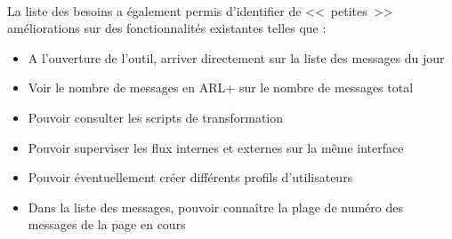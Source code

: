 			\paragraph{}%
			La liste des besoins a également permis d'identifier de <<~petites~>>
			améliorations sur des fonctionnalités existantes telles que :
			\begin{itemize}
			  \item A l'ouverture de l'outil, arriver directement sur la liste des
			  messages du jour
			  \item Voir le nombre de messages en ARL+ sur le nombre de messages total
			  \item Pouvoir consulter les scripts de transformation
			  \item Pouvoir superviser les flux internes et externes sur la même
			  interface
			  \item Pouvoir éventuellement créer différents profils d'utilisateurs
			  \item Dans la liste des messages, pouvoir connaître la plage de numéro des
			  messages de la page en cours
			\end{itemize}
			